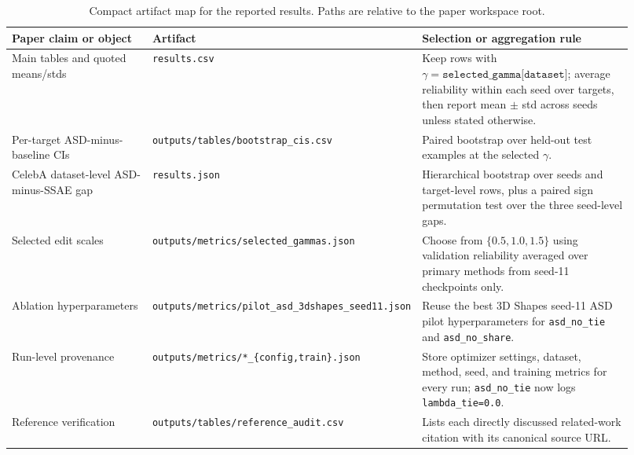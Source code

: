 \documentclass{article}
\begin{document}
\begin{table}[h]
\caption{Compact artifact map for the reported results. Paths are relative to the paper workspace root.}
\label{tab:artifact-map}
\centering
\small
\begin{tabular}{p{0.29\linewidth}p{0.23\linewidth}p{0.40\linewidth}}
\toprule
Paper claim or object & Artifact & Selection or aggregation rule \\
\midrule
Main tables and quoted means/stds & \texttt{results.csv} & Keep rows with $\gamma=\texttt{selected\_gamma[dataset]}$; average reliability within each seed over targets, then report mean $\pm$ std across seeds unless stated otherwise. \\
Per-target ASD-minus-baseline CIs & \texttt{outputs/tables/bootstrap\_cis.csv} & Paired bootstrap over held-out test examples at the selected $\gamma$. \\
CelebA dataset-level ASD-minus-SSAE gap & \texttt{results.json} & Hierarchical bootstrap over seeds and target-level rows, plus a paired sign permutation test over the three seed-level gaps. \\
Selected edit scales & \texttt{outputs/metrics/selected\_gammas.json} & Choose from $\{0.5,1.0,1.5\}$ using validation reliability averaged over primary methods from seed-11 checkpoints only. \\
Ablation hyperparameters & \texttt{outputs/metrics/pilot\_asd\_3dshapes\_seed11.json} & Reuse the best 3D Shapes seed-11 ASD pilot hyperparameters for \texttt{asd\_no\_tie} and \texttt{asd\_no\_share}. \\
Run-level provenance & \texttt{outputs/metrics/*\_\{config,train\}.json} & Store optimizer settings, dataset, method, seed, and training metrics for every run; \texttt{asd\_no\_tie} now logs \texttt{lambda\_tie=0.0}. \\
Reference verification & \texttt{outputs/tables/reference\_audit.csv} & Lists each directly discussed related-work citation with its canonical source URL. \\
\bottomrule
\end{tabular}
\end{table}



\end{document}
